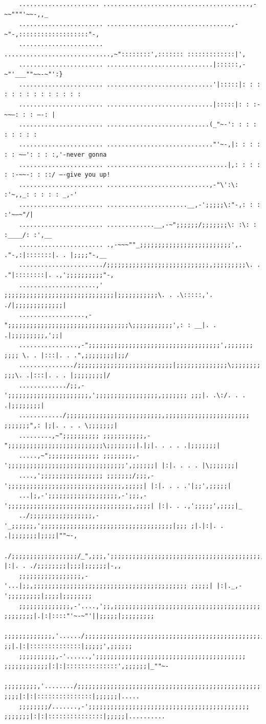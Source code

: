 \documentclass[10pt]{article}
\begin{document}
	\begin{verbatim}
	...................... ........................................,-~~"""'~~-,,_
	....................... ..................................,-~"-,:::::::::::::::::::"-,
	....................... .............................,~"::::::::',::::::: :::::::::::::|',
	....................... .............................|::::::,-~"'___""~~-~"':}
	....................... .............................'|:::::|: : : : : : : : : : : : : :
	....................... .............................|:::::|: : :-~~—: : : —-: |
	....................... ............................(_"~-': : : : : : : : :
	....................... ............................."'~-,|: : : : : : ~—': : : :,'-never gonna
	....................... .................................|,: : : : : :-~~-: : ::/ —-give you up!
	....................... ............................,-"\':\: :'~,,_: : : : : _,-'
	....................... ......................__,-';;;;;\:"-,: : : :'~—~"/|
	....................... .............__,-~";;;;;;/;;;;;;;\: :\: : :____/: :',__
	....................... .,-~~~""_;;;;;;;;;;;;;;;;;;;;;;;;;',. ."-,:|:::::::|. . |;;;;"-,__
	......................./;;;;;;;;;;;;;;;;;;;;;;;;;;;;,;;;;;;;;;\. . ."|::::::::|. .,';;;;;;;;;;"-,
	.....................,' ;;;;;;;;;;;;;;;;;;;;;;;;;;;;;;|;;;;;;;;;;;\. . .\:::::,'. ./|;;;;;;;;;;;;;|
	..................,-";;;;;;;;;;;;;;;;;;;;;;;;;;;;;;;;;\;;;;;;;;;;;',: : __|. . .|;;;;;;;;;,';;|
	................,-";;;;;;;;;;;;;;;;;;;;;;;;;;;;;;;;;;;;',;;;;;;; ;;;; \. . |:::|. . .",;;;;;;;;|;;/
	.............../;;;;;;;;;;;;;;;;;;;;;;;;;;|;;;;;;;;;;;;;;\;;;;;;;; ;;;\. .|:::|. . . |;;;;;;;;|/
	............./;;,-';;;;;;;;;;;;;;;;;;;;;;,';;;;;;;;;;;;;;;;;,;;;;;;; ;;;|. .\:/. . . .|;;;;;;;;|
	............/;;;;;;;;;;;;;;;;;;;;;;;;;;,;;;;;;;;;;;;;;;;;;;;;;; ;;;;;;;",: |;|. . . . \;;;;;;;|
	.........,~";;;;;;;;;; ;;;;;;;;;;;,-";;;;;;;;;;;;;;;;;;;;;;;;;;\;;;;;;;;|.|;|. . . . .|;;;;;;;|
	.....,~";;;;;;;;;;;;;; ;;;;;;;;,-';;;;;;;;;;;;;;;;;;;;;;;;;;;;;;;;',;;;;;;| |:|. . . . |\;;;;;;;|
	....,';;;;;;;;;;;;;;;;; ;;;;;;;/;;;,-';;;;;;;;;;;;;;;;;;;;;;;;;;;;;;;,;;;;;| |:|. . . .'|;;',;;;;;|
	...|;,-';;;;;;;;;;;;;;;;;;;,-';;;,-';;;;;;;;;;;;;;;;;;;;;;;;;;;;;;;;;;,;;;;| |:|. . .,';;;;;',;;;;|_
	../;;;;;;;;;;;;;;;;;,-'_;;;;;;,';;;;;;;;;;;;;;;;;;;;;;;;;;;;;;;;;;;;|;;; ;|.|:|. . .|;;;;;;;|;;;;|""~-,
	./;;;;;;;;;;;;;;;;;;/_",;;;,';;;;;;;;;;;;;;;;;;;;;;;;;;;;;;;;;;;;;;;;;,;;| |:|. . ./;;;;;;;;|;;;|;;;;;;|-,,
	;;;;;;;;;;;;;;;;;,-'...|;;,;;;;;;;;;;;;;;;;;;;;;;;;;;;;;;;;;;;;;;;;;; ;;;;;| |:|._,-';;;;;;;;;|;;;;|;;;;;;;;
	;;;;;;;;;;;;;;,-'....,';;,;;;;;;;;;;;;;;;;;;;;;;;;;;;;;;;;;;;;;;;; ;;;;;;;;|.|:|::::"'~-~"'||;;;;;|;;;;;;;;;
	;;;;;;;;;;;;;,'....../;;;;;;;;;;;;;;;;;;;;;;;;;;;;;;;;;;;;;;;;;;;;;;;;;; ;;|.|:|::::::::::::::|;;;;;',;;;;;;
	;;;;;;;;;;,-'......,';;;;;;;;;;;;;;;;;;;;;;;;;;;;;;;;;;;;;;;;; ;;;;;;;;;;;;|:|:|::::::::::::::',;;;;;;|_""~-
	;;;;;;;;;,'......../;;;;;;;;;;;;;;;;;;;;;;;;;;;;;;;;;;;;;;;;;;;;;;;;;; ;;;;|:|:|:::::::::::::::|;;;;;;|.....
	;;;;;;;;/.......,-';;;;;;;;;;;;;;;;;;;;;;;;;;;;;;;;;;;;;;;;;;;; ;;;;;;;|:|:|:::::::::::::::|;;;;;|..........
	\end{verbatim}
\end{document}
